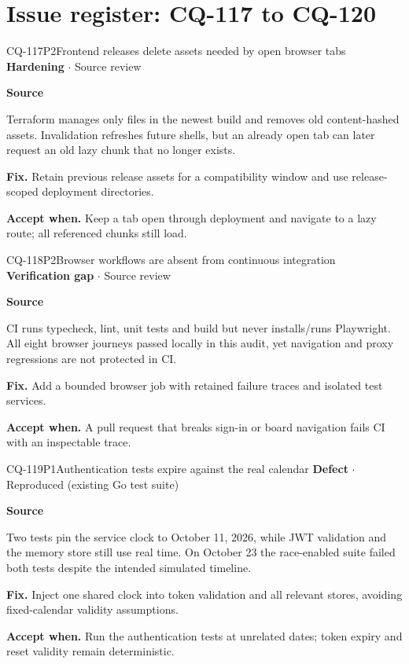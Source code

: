 \section*{Issue register: CQ-117 to CQ-120}
\begin{finding}{CQ-117}{P2}{Frontend releases delete assets needed by open browser tabs}
\textbf{Hardening} $\cdot$ Source review\par
\textbf{Source}\quad{}\par
Terraform manages only files in the newest build and removes old content-hashed assets. Invalidation refreshes future shells, but an already open tab can later request an old lazy chunk that no longer exists.\par
\textbf{Fix.} Retain previous release assets for a compatibility window and use release-scoped deployment directories.\par
\textbf{Accept when.} Keep a tab open through deployment and navigate to a lazy route; all referenced chunks still load.
\end{finding}
\begin{finding}{CQ-118}{P2}{Browser workflows are absent from continuous integration}
\textbf{Verification gap} $\cdot$ Source review\par
\textbf{Source}\quad{}\par
CI runs typecheck, lint, unit tests and build but never installs/runs Playwright. All eight browser journeys passed locally in this audit, yet navigation and proxy regressions are not protected in CI.\par
\textbf{Fix.} Add a bounded browser job with retained failure traces and isolated test services.\par
\textbf{Accept when.} A pull request that breaks sign-in or board navigation fails CI with an inspectable trace.
\end{finding}
\begin{finding}{CQ-119}{P1}{Authentication tests expire against the real calendar}
\textbf{Defect} $\cdot$ Reproduced (existing Go test suite)\par
\textbf{Source}\quad{}\par
Two tests pin the service clock to October 11, 2026, while JWT validation and the memory store still use real time. On October 23 the race-enabled suite failed both tests despite the intended simulated timeline.\par
\textbf{Fix.} Inject one shared clock into token validation and all relevant stores, avoiding fixed-calendar validity assumptions.\par
\textbf{Accept when.} Run the authentication tests at unrelated dates; token expiry and reset validity remain deterministic.
\end{finding}
